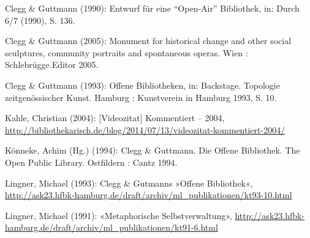 \documentclass[a4paper,
fontsize=11pt,
oneside,
numbers=noperiodatend,
parskip=half-,
bibliography=totoc,
final
]{scrartcl}
\begin{document}
Clegg \& Guttmann (1990): Entwurf für eine \enquote{Open-Air}
Bibliothek, in: Durch 6/7 (1990), S. 136.

Clegg \& Guttmann (2005): Monument for historical change and other
social sculptures, community portraits and spontaneous operas. Wien :
Schlebrügge.Editor 2005.

Clegg \& Guttmann (1993): Offene Bibliotheken, in: Backstage. Topologie
zeitgenössischer Kunst. Hamburg : Kunstverein in Hamburg 1993, S. 10.

Kahle, Christian (2004): {[}Videozitat{]} Kommentiert -- 2004,
\url{http://bibliothekarisch.de/blog/2014/07/13/videozitat-kommentiert-2004/}

Könneke, Achim (Hg.) (1994): Clegg \& Guttmann. Die Offene Bibliothek.
The Open Public Library. Ostfildern : Cantz 1994.

Lingner, Michael (1993): Clegg \& Gutmanns »Offene Bibliothek«,
\url{http://ask23.hfbk-hamburg.de/draft/archiv/ml_publikationen/kt93-10.html}

Lingner, Michael (1991): «Metaphorische Selbstverwaltung»,
\url{http://ask23.hfbk-hamburg.de/draft/archiv/ml_publikationen/kt91-6.html}

\end{document}
